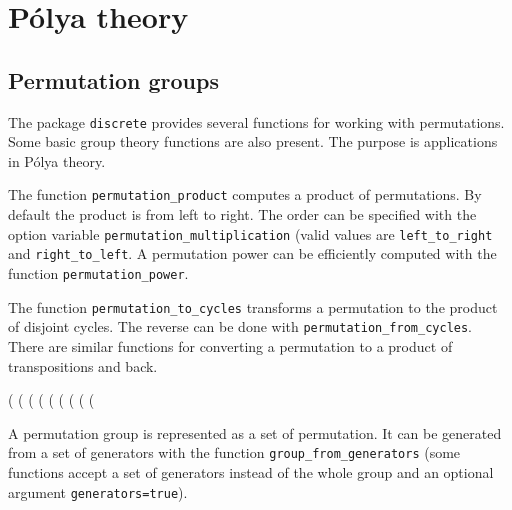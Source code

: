 \documentclass[11pt]{article}
\newcommand{\command}[1]{\texttt{#1}}
\begin{document}
\section{P\'olya theory}

\subsection{Permutation groups}

The package \command{discrete} provides several functions for working
with permutations. Some basic group theory functions are also
present. The purpose is applications in P\'olya theory.

The function \command{permutation\_product} computes a product of
permutations. By default the product is from left to right.  The order
can be specified with the option variable
\command{permutation\_multiplication} (valid values are
\command{left\_to\_right} and \command{right\_to\_left}. A permutation
power can be efficiently computed with the function
\command{permutation\_power}.

The function \command{permutation\_to\_cycles} transforms a
permutation to the product of disjoint cycles. The reverse can be done
with \command{permutation\_from\_cycles}. There are similar functions
for converting a permutation to a product of transpositions and back.

\begin{example}
(%
(%
(%
(%
(%
(%
(%
(%
(%
\end{example}
%
A permutation group is represented as a set of permutation. It can be
generated from a set of generators with the function
\command{group\_from\_generators} (some functions accept a set of
generators instead of the whole group and an optional argument
\command{generators=true}).
\end{document}
